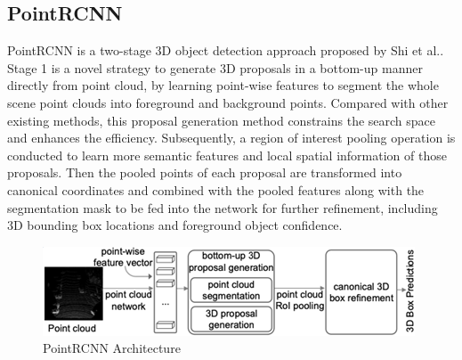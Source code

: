 \subsection{PointRCNN}
PointRCNN is a two-stage 3D object detection approach proposed by Shi et al.\cite{shi_pointrcnn_2019}. Stage 1 is a novel strategy to generate 3D proposals in a bottom-up manner directly from point cloud, by learning point-wise features to segment the whole scene point clouds into foreground and background points. Compared with other existing methods, this proposal generation method constrains the search space and enhances the efficiency. Subsequently, a region of interest pooling operation is conducted to learn more semantic features and local spatial information of those proposals. Then the pooled points of each proposal are transformed into canonical coordinates and combined with the pooled features along with the segmentation mask to be fed into the network for further refinement, including 3D bounding box locations and foreground object confidence.
\begin{figure}[!htbp]
\centering
\includegraphics[scale=1]{Graphics/PointRCNN.png}
\caption{PointRCNN Architecture}
\label{fig:PointRCNN}
\end{figure}
